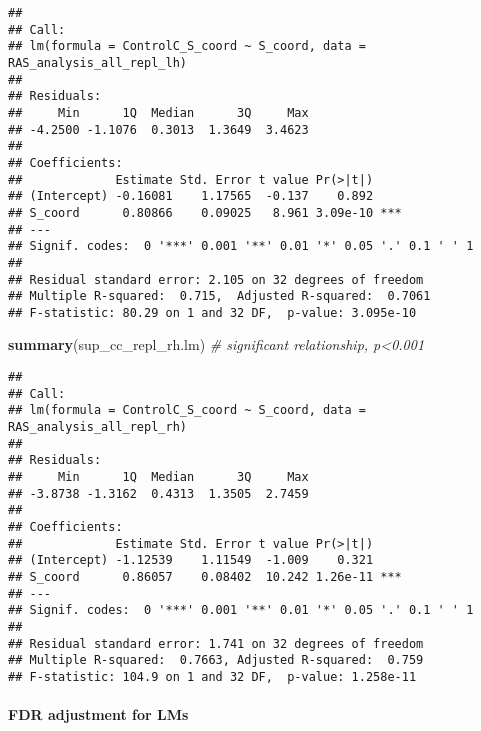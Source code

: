 \documentclass[
]{article}
\newenvironment{Shaded}{\begin{snugshade}}{\end{snugshade}}
\newcommand{\CommentTok}[1]{\textcolor[rgb]{0.56,0.35,0.01}{\textit{#1}}}
\newcommand{\KeywordTok}[1]{\textcolor[rgb]{0.13,0.29,0.53}{\textbf{#1}}}
\newcommand{\NormalTok}[1]{#1}
\begin{document}
\begin{verbatim}
## 
## Call:
## lm(formula = ControlC_S_coord ~ S_coord, data = RAS_analysis_all_repl_lh)
## 
## Residuals:
##     Min      1Q  Median      3Q     Max 
## -4.2500 -1.1076  0.3013  1.3649  3.4623 
## 
## Coefficients:
##             Estimate Std. Error t value Pr(>|t|)    
## (Intercept) -0.16081    1.17565  -0.137    0.892    
## S_coord      0.80866    0.09025   8.961 3.09e-10 ***
## ---
## Signif. codes:  0 '***' 0.001 '**' 0.01 '*' 0.05 '.' 0.1 ' ' 1
## 
## Residual standard error: 2.105 on 32 degrees of freedom
## Multiple R-squared:  0.715,  Adjusted R-squared:  0.7061 
## F-statistic: 80.29 on 1 and 32 DF,  p-value: 3.095e-10
\end{verbatim}

\begin{Shaded}
\begin{Highlighting}[]
\KeywordTok{summary}\NormalTok{(sup_cc_repl_rh.lm) }\CommentTok{# significant relationship, p<0.001}
\end{Highlighting}
\end{Shaded}

\begin{verbatim}
## 
## Call:
## lm(formula = ControlC_S_coord ~ S_coord, data = RAS_analysis_all_repl_rh)
## 
## Residuals:
##     Min      1Q  Median      3Q     Max 
## -3.8738 -1.3162  0.4313  1.3505  2.7459 
## 
## Coefficients:
##             Estimate Std. Error t value Pr(>|t|)    
## (Intercept) -1.12539    1.11549  -1.009    0.321    
## S_coord      0.86057    0.08402  10.242 1.26e-11 ***
## ---
## Signif. codes:  0 '***' 0.001 '**' 0.01 '*' 0.05 '.' 0.1 ' ' 1
## 
## Residual standard error: 1.741 on 32 degrees of freedom
## Multiple R-squared:  0.7663, Adjusted R-squared:  0.759 
## F-statistic: 104.9 on 1 and 32 DF,  p-value: 1.258e-11
\end{verbatim}

\hypertarget{fdr-adjustment-for-lms}{%
\paragraph{FDR adjustment for LMs}\label{fdr-adjustment-for-lms}}
\end{document}
